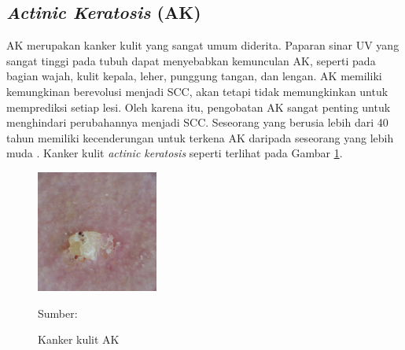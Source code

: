     \subsection{\textit{Actinic Keratosis} (AK)}
    AK merupakan kanker kulit yang sangat umum diderita. Paparan sinar UV yang sangat tinggi pada tubuh dapat menyebabkan kemunculan AK, seperti pada bagian wajah, kulit kepala, leher, punggung tangan, dan lengan. AK memiliki kemungkinan berevolusi menjadi SCC, akan tetapi tidak memungkinkan untuk memprediksi setiap lesi. Oleh karena itu, pengobatan AK sangat penting untuk menghindari perubahannya menjadi SCC. Seseorang yang berusia lebih dari 40 tahun memiliki kecenderungan untuk terkena AK daripada seseorang yang lebih muda \citep{Dianzani2020}. Kanker kulit \textit{actinic keratosis} seperti terlihat pada Gambar \ref{fig:ak}.
    \begin{figure}[H] 
        \begin{center} 
            \includegraphics[width=4cm]{img/bab2/ak.jpg}
            \caption{Kanker kulit AK} 
            \label{fig:ak}
            Sumber: \citep{Codella2018,Combalia2019,Tschandl2018}
        \end{center} 
    \end{figure}

